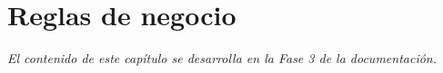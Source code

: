 \chapter{Reglas de negocio}\label{cap:rn}

\textit{El contenido de este capítulo se desarrolla en la Fase 3 de la documentación.}
